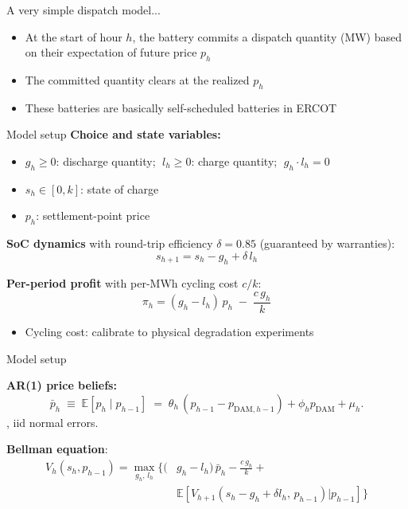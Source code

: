 \documentclass{beamer}
\begin{document}
\begin{frame}{A very simple dispatch model...}

\begin{itemize}
    \item At the start of hour $h$, the battery commits a dispatch quantity (MW) based on their expectation of future price $p_h$
    \item The committed quantity clears at the realized $p_h$
    \item These batteries are basically self-scheduled batteries in ERCOT
\end{itemize}
\end{frame}

\begin{frame}{Model setup}
\textbf{Choice and state variables:}
\begin{itemize}
    \item $g_h \geq 0$: discharge quantity; $\;l_h \geq 0$: charge quantity; $\;g_h \cdot l_h = 0$
    \item $s_h \in [0, k]$: state of charge 
    \item $p_h$: settlement-point price
\end{itemize}

\vspace{0.2cm}
\textbf{SoC dynamics} with round-trip efficiency $\delta = 0.85$ (guaranteed by warranties):
\[
s_{h+1} = s_h - g_h + \delta\, l_h
\]

\textbf{Per-period profit} with per-MWh cycling cost $c/k$:
\[
\pi_h = (g_h - l_h)\,p_h \;-\; \frac{c\,g_h}{k}
\]
\begin{itemize}
    \item Cycling cost: calibrate to physical degradation experiments
\end{itemize}

\end{frame}

\begin{frame}{Model setup}


\textbf{AR(1) price beliefs:}
\[
\bar p_h \;\equiv\; \mathbb{E}[p_h\mid p_{h-1}] \;=\; \theta_h\, (p_{h-1} - p_{\text{DAM}, h-1}) + \phi_h p_{\text{DAM}} + \mu_h.
\], iid normal errors.

\vspace{0.2cm}
\textbf{Bellman equation}: 
\begin{align*}
    V_h(s_h, p_{h-1}) =  \max_{g_h,\,l_h}\Big\{(&g_h - l_h)\,\bar p_h - \tfrac{c\,g_h}{k} + \\ &\mathbb{E}[ V_{h+1}(s_h - g_h + \delta l_h,\, p_{h-1}) | p_{h-1}]\Big\}
\end{align*}

\end{frame}
\end{document}
